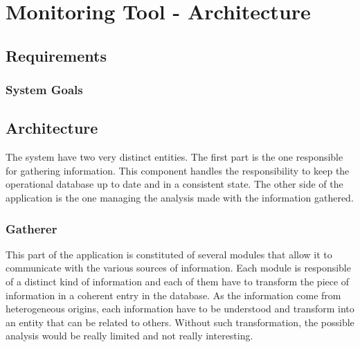 
\chapter{Monitoring Tool - Architecture} %

\label{Chapter4} %

\section{Requirements}
\subsection{System Goals}

\section{Architecture}
The system have two very distinct entities. The first part is the one responsible for gathering information. This component handles the responsibility to keep the operational database up to date and in a consistent state. The other side of the application is the one managing the analysis made with the information gathered.

\subsection{Gatherer}
This part of the application is constituted of several modules that allow it to communicate with the various sources of information. Each module is responsible of a distinct kind of information and each of them have to transform the piece of information in a coherent entry in the database. As the information come from heterogeneous origins, each information have to be understood and transform into an entity that can be related to others. Without such transformation, the possible analysis would be really limited and not really interesting.

